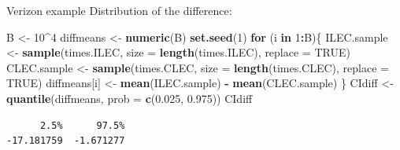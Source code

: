 \documentclass[
  ignorenonframetext,
]{beamer}
\newenvironment{Shaded}{\begin{snugshade}}{\end{snugshade}}
\newcommand{\AttributeTok}[1]{\textcolor[rgb]{0.13,0.29,0.53}{#1}}
\newcommand{\ConstantTok}[1]{\textcolor[rgb]{0.56,0.35,0.01}{#1}}
\newcommand{\ControlFlowTok}[1]{\textcolor[rgb]{0.13,0.29,0.53}{\textbf{#1}}}
\newcommand{\DecValTok}[1]{\textcolor[rgb]{0.00,0.00,0.81}{#1}}
\newcommand{\FloatTok}[1]{\textcolor[rgb]{0.00,0.00,0.81}{#1}}
\newcommand{\FunctionTok}[1]{\textcolor[rgb]{0.13,0.29,0.53}{\textbf{#1}}}
\newcommand{\NormalTok}[1]{#1}
\newcommand{\OtherTok}[1]{\textcolor[rgb]{0.56,0.35,0.01}{#1}}
\newcommand{\SpecialCharTok}[1]{\textcolor[rgb]{0.81,0.36,0.00}{\textbf{#1}}}
\begin{document}
\begin{frame}[fragile]{Verizon example}
\protect\hypertarget{verizon-example-6}{}
Distribution of the difference:

\small

\begin{Shaded}
\begin{Highlighting}[]
\NormalTok{B }\OtherTok{\textless{}{-}} \DecValTok{10}\SpecialCharTok{\^{}}\DecValTok{4}
\NormalTok{diffmeans }\OtherTok{\textless{}{-}} \FunctionTok{numeric}\NormalTok{(B)}
\FunctionTok{set.seed}\NormalTok{(}\DecValTok{1}\NormalTok{)}
\ControlFlowTok{for}\NormalTok{ (i }\ControlFlowTok{in} \DecValTok{1}\SpecialCharTok{:}\NormalTok{B)\{}
\NormalTok{  ILEC.sample }\OtherTok{\textless{}{-}} \FunctionTok{sample}\NormalTok{(times.ILEC, }\AttributeTok{size =} \FunctionTok{length}\NormalTok{(times.ILEC), }
                        \AttributeTok{replace =} \ConstantTok{TRUE}\NormalTok{)}
\NormalTok{  CLEC.sample }\OtherTok{\textless{}{-}} \FunctionTok{sample}\NormalTok{(times.CLEC, }\AttributeTok{size =} \FunctionTok{length}\NormalTok{(times.CLEC), }
                        \AttributeTok{replace =} \ConstantTok{TRUE}\NormalTok{)}
\NormalTok{  diffmeans[i] }\OtherTok{\textless{}{-}} \FunctionTok{mean}\NormalTok{(ILEC.sample) }\SpecialCharTok{{-}} \FunctionTok{mean}\NormalTok{(CLEC.sample)}
\NormalTok{\}}
\NormalTok{CIdiff }\OtherTok{\textless{}{-}} \FunctionTok{quantile}\NormalTok{(diffmeans, }\AttributeTok{prob =} \FunctionTok{c}\NormalTok{(}\FloatTok{0.025}\NormalTok{, }\FloatTok{0.975}\NormalTok{))}
\NormalTok{CIdiff}
\end{Highlighting}
\end{Shaded}

\begin{verbatim}
      2.5%      97.5% 
-17.181759  -1.671277 
\end{verbatim}

\normalsize
\end{frame}
\end{document}
